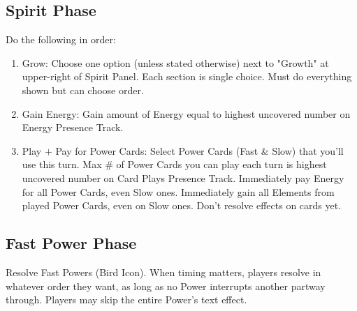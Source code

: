\documentclass[12pt]{article}
\newenvironment{enumerateCustom}
{\begin{enumerate}
  \setlength{\itemsep}{1pt}
  \setlength{\parskip}{0pt}
  \setlength{\parsep}{0pt}}
{\end{enumerate}}
\begin{document}
\begin{multicols*}{2}
\subsection*{Spirit Phase}
Do the following in order:
\begin{enumerateCustom}
    \item Grow: Choose one option (unless stated otherwise) next to "Growth" at upper-right of Spirit Panel. Each section is single choice. Must do everything shown but can choose order.
    \item Gain Energy: Gain amount of Energy equal to highest uncovered number on Energy Presence Track.
    \item Play $+$ Pay for Power Cards: Select Power Cards (Fast \& Slow) that you'll use this turn. Max \# of Power Cards you can play each turn is highest uncovered number on Card Plays Presence Track. Immediately pay Energy for all Power Cards, even Slow ones. Immediately gain all Elements from played Power Cards, even on Slow ones. Don't resolve effects on cards yet.
\end{enumerateCustom}

\subsection*{Fast Power Phase}
Resolve Fast Powers (Bird Icon). When timing matters, players resolve in whatever order they want, as long as no Power interrupts another partway through. Players may skip the entire Power's text effect.


\end{multicols*}
\end{document}
